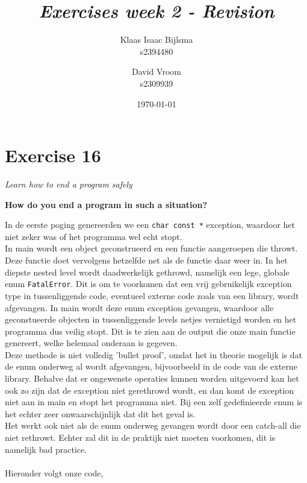 \documentclass[12pt]{article}
\title{\itshape Exercises week 2 - Revision}
\author{
	Klaas Isaac Bijlsma \\ s2394480
	\and
	David Vroom \\ s2309939
}
\date{\today}
\newcommand{\desc}[1]{\textit{#1} \vspace{1em}}
\begin{document}
\maketitle

\section*{Exercise 16}
\desc{Learn how to end a program safely}

\textbf{How do you end a program in such a situation?}

In de eerste poging genereerden we een \texttt{char const *} exception, waardoor het niet zeker was of het programma wel echt stopt.\\

In main wordt een object geconstrueerd en een functie aangeroepen die throwt. Deze functie doet vervolgens hetzelfde net als de functie daar weer in. In het diepste nested level wordt daadwerkelijk gethrowd, namelijk een lege, globale enum \texttt{FatalError}. Dit is om te voorkomen dat een vrij gebruikelijk exception type in tussenliggende code, eventueel externe code zoals van een library, wordt afgevangen. In main wordt deze enum exception gevangen, waardoor alle geconstueerde objecten in tussenliggende levels netjes vernietigd worden en het programma dus veilig stopt. Dit is te zien aan de output die onze main functie genereert, welke helemaal onderaan is gegeven.\\
Deze methode is niet volledig 'bullet proof', omdat het in theorie mogelijk is dat de enum onderweg al wordt afgevangen, bijvoorbeeld in de code van de externe library. Behalve dat er ongewenste operaties kunnen worden uitgevoerd kan het ook zo zijn dat de exception niet gerethrowd wordt, en dan komt de exception niet aan in main en stopt het programma niet. Bij een zelf gedefinieerde enum is het echter zeer onwaarschijnlijk dat dit het geval is. \\
Het werkt ook niet als de enum onderweg gevangen wordt door een catch-all die niet rethrowt. Echter zal dit in de praktijk niet moeten voorkomen, dit is namelijk bad practice. \\
\\
Hieronder volgt onze code,












\end{document}
